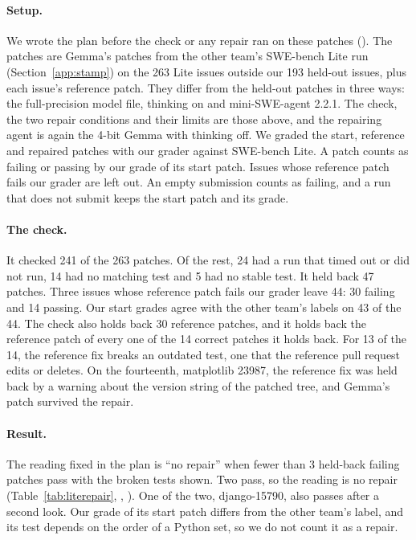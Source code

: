 \documentclass[10pt,letterpaper]{article}
\begin{document}
\paragraph{Setup.} We wrote the plan before the check or any repair ran on these patches
(). The patches are Gemma's patches from the other team's SWE-bench Lite run
(Section~\ref{app:stamp}) on the 263 Lite issues outside our 193 held-out issues, plus each issue's reference patch.
They differ from the held-out patches in three ways: the full-precision model file, thinking on and mini-SWE-agent
2.2.1. The check, the two repair conditions and their limits are those above, and the repairing agent is again the
4-bit Gemma with thinking off. We graded the start, reference and repaired patches with our grader against SWE-bench
Lite. A patch counts as failing or passing by our grade of its start patch. Issues whose reference patch fails our
grader are left out. An empty submission counts as failing, and a run that does not submit keeps the start patch and its grade.

\paragraph{The check.} It checked 241 of the 263 patches. Of the rest, 24 had a run that timed out or did not run, 14
had no matching test and 5 had no stable test. It held back 47 patches. Three issues whose reference patch fails our
grader leave 44: 30 failing and 14 passing. Our start grades agree with the other team's labels on 43 of the 44. The
check also holds back 30 reference patches, and it holds back the reference patch of every one of the 14 correct
patches it holds back. For 13 of the 14, the reference fix breaks an outdated test, one that the reference pull
request edits or deletes. On the fourteenth, matplotlib 23987, the reference fix was held back by a warning about the
version string of the patched tree, and Gemma's patch survived the repair.

\paragraph{Result.} The reading fixed in the plan is ``no repair'' when fewer than 3 held-back failing patches pass
with the broken tests shown. Two pass, so the reading is no repair (Table~\ref{tab:literepair},
, ). One of the two,
django-15790, also passes after a second look. Our grade of its start patch differs from the other team's label, and
its test depends on the order of a Python set, so we do not count it as a repair.
\end{document}
